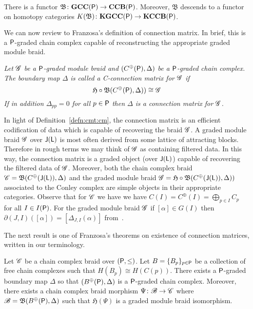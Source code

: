 \begin{cor}\label{cor:cmt:functor}
There is a functor $\mathfrak{B}\colon {\bf GCC}({\mathsf P})\to {\bf CCB}({\mathsf P})$.  Moreover, $\mathfrak{B}$ descends to a functor on homotopy categories $K(\mathfrak{B})\colon {\bf KGCC({\mathsf P})}\to {\bf KCCB({\mathsf P})}$.  
\end{cor}

We can now review to Franzosa's definition of connection matrix.  In brief, this is a ${\mathsf P}$-graded chain complex capable of reconstructing the appropriate graded module braid.

\begin{defn}\label{defn:cmt:cm}
{\em
Let $\mathscr{G}$ be a ${\mathsf P}$-graded module braid and $(C^\oplus({\mathsf P}),\Delta)$ be a ${\mathsf P}$-graded chain complex.  The boundary map $\Delta$ is called a {\em C-connection matrix for} $\mathscr{G}$ if $$\mathfrak{H}\circ \mathfrak{B}(C^\oplus({\mathsf P}),\Delta))\cong \mathscr{G}$$  If in addition $\Delta_{pp}=0$ for all $p\in {\mathsf P}$ then $\Delta$ is a {\em connection matrix for} $\mathscr{G}$.
}
\end{defn}


  In light of Definition~\ref{defn:cmt:cm}, the connection matrix is an efficient codification of data which is capable of recovering the braid $\mathscr{G}$.  A graded module braid $\mathscr{G}$ over ${\mathsf J}({\mathsf L})$ is most often derived from some lattice of attracting blocks.  Therefore in rough terms we may think of $\mathscr{G}$ as containing filtered data.  In this way, the connection matrix is a graded object (over ${\mathsf J}({\mathsf L})$) capable of recovering the filtered data of $\mathscr{G}$.  Moreover, both the chain complex braid $\mathscr{C} = \mathfrak{B}(C^\oplus({\mathsf J}({\mathsf L})),\Delta)$ and the graded module braid $\mathscr{G} = \mathfrak{H}\circ \mathfrak{B}(C^\oplus({\mathsf J}({\mathsf L})),\Delta))$ associated to the Conley complex are simple objects in their appropriate categories.  Observe that for $\mathscr{C}$ we have  we have $C(I) = C^\oplus(I) = \bigoplus_{p\in I} C_p$ for all $I\in I({\mathsf P})$.  For the graded module braid $\mathscr{G}$ if $[\alpha] \in G(I)$ then $\partial(J,I)([\alpha]) = [\Delta_{J,I}(\alpha)]$ from~\cite[Proposition 3.5]{fran}. 
  
  
 The next result is one of Franzosa's theorems on existence of connection matrices, written in our terminology.

\begin{thm}
Let $\mathscr{C}$ be a chain complex braid over $({\mathsf P},\leq)$.  Let $B=\{B_p\}_{p\in {\mathsf P}}$ be a collection of free chain complexes such that $H(B_p) \cong H(C(p))$.  There exists a ${\mathsf P}$-graded boundary map $\Delta$ so that  $(B^\oplus({\mathsf P}),\Delta)$ is a ${\mathsf P}$-graded chain complex.  Moreover, there exists a chain complex braid morphism $\Psi\colon \mathscr{B}  \to \mathscr{C}$ where $\mathscr{B}= \mathfrak{B}(B^\oplus({\mathsf P}),\Delta)$ such that $\mathfrak{H}(\Psi)$ is a graded module braid isomorphism.
\end{thm}

